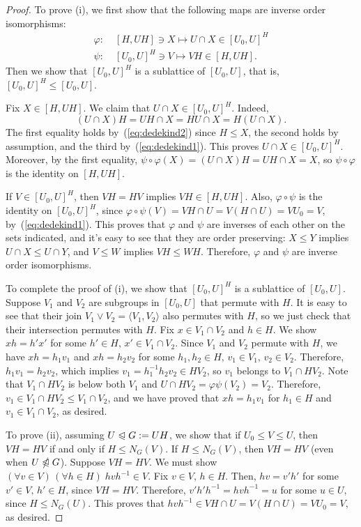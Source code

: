 \documentclass[11pt]{amsart}
\theoremstyle{plain}
\theoremstyle{definition}
\newcounter{claim}
\theoremstyle{remark}
\numberwithin{theorem}{section}
\numberwithin{claim}{section}
\numberwithin{equation}{section}
\numberwithin{conjecture}{section}
\newcommand{\<}{\ensuremath{\langle}}
\renewcommand{\>}{\ensuremath{\rangle}}
\renewcommand{\leq}{\ensuremath{\leqslant}}
\newcommand{\subnormal}{\ensuremath{\trianglelefteqslant}}
\newcommand{\notsubnormal}{\ensuremath{\ntrianglelefteqslant}}
\newcommand{\join}{\ensuremath{\vee}}
\newcommand{\0}{\ensuremath{\mathbf{0}}}
\newcommand{\1}{\ensuremath{\mathbf{1}}}
\newcommand{\2}{\ensuremath{\mathbf{2}}}
\newcommand{\3}{\ensuremath{\mathbf{3}}}
\newcommand{\4}{\ensuremath{\mathbf{4}}}
\newcommand{\5}{\ensuremath{\mathbf{5}}}
\renewcommand{\phi}{\ensuremath{\varphi}}
\begin{document}
\begin{proof}
To prove (i), we first show that the following maps are inverse order isomorphisms:
\begin{align}
\label{eq:inverse-isos}
\phi: \;& [H, UH] \ni X \mapsto U\cap X \in [U_0, U]^H\\
\psi: \;& [U_0, U]^H \ni V \mapsto VH \in [H, UH].\nonumber
\end{align}
Then we show that $[U_0, U]^H$ is a sublattice of $[U_0,U]$, that is, 
$[U_0, U]^H\leq [U_0,U]$.

Fix $X\in [H, UH]$. We claim that $U\cap X \in [U_0, U]^H$. Indeed,
\[
    (U\cap X) H = UH \cap X=
               HU \cap X
                = H(U \cap X).
\]
The first equality holds by~(\ref{eq:dedekind2}) since $H\leq X$, the second holds
by assumption, and the third by~(\ref{eq:dedekind1}).
  This proves $U\cap X \in [U_0, U]^H$.  Moreover, by the first equality,
$\psi \circ \phi (X) = (U\cap X)H =UH \cap X = X$,
so $\psi \circ \phi$ is the identity on $[H, UH]$.

If $V\in [U_0, U]^H$, then $VH = HV$ implies $VH \in [H, UH]$. Also, $\phi \circ
\psi$ is the identity on $[U_0, U]^H$, since $\phi \circ \psi(V)= VH \cap U =
V(H\cap U)= VU_0 = V$, by~(\ref{eq:dedekind1}). 
This proves that $\phi$ and $\psi$ are inverses of each other on the sets indicated, and
it's easy to see that they are order preserving:
$X\leq Y$ implies $U\cap X \leq U\cap Y$, and $V\leq W$ implies $VH \leq WH$.
Therefore, $\phi$ and $\psi$ are inverse order isomorphisms.

To complete the proof of (i), we show that
$[U_0, U]^H$ is a sublattice of $[U_0, U]$.  Suppose $V_1$ and $V_2$ are
subgroups in $[U_0, U]$ that permute with $H$.  
It is easy to see that their join $V_1 \join V_2 = \<V_1, V_2\>$ also permutes
with $H$, so we just check that their intersection permutes with $H$.  Fix
$x \in V_1 \cap V_2$ and $h\in H$.  We show $xh = h'x'$ for some $h'\in H, \, x'
\in V_1\cap V_2$. Since $V_1$ and $V_2$ permute with $H$, we have $xh = h_1 v_1$
and $xh = h_2 v_2$ for some $h_1, h_2\in H, \, v_1 \in V_1, \, v_2 \in V_2$.
Therefore, $h_1 v_1 = h_2 v_2$, which implies $v_1 = h_1^{-1}h_2 v_2 \in HV_2$,
so $v_1$ belongs to $V_1 \cap HV_2$. Note that $V_1 \cap HV_2$ is below both $V_1$ and
$U\cap HV_2 = \phi \psi(V_2) = V_2$.  Therefore, $v_1 \in V_1 \cap HV_2 \leq V_1
\cap V_2$, and we have proved that $xh = h_1 v_1$ for $h_1\in H$ and $v_1 \in
V_1\cap V_2$, as desired. 

To prove (ii), assuming $U\subnormal G:=UH$, we show that if $U_0 \leq V \leq U$,
then $VH = HV$ if and only if $H\leq N_G(V)$.
If $H\leq N_G(V)$, then $VH = HV$ (even when $U \notsubnormal G$).
Suppose $VH = HV$.  We must show $(\forall v\in V)\, (\forall h\in H)\; hvh^{-1}\in
V$.  Fix $v\in V, \, h\in H$.  Then, $hv = v'h'$ for some $v'\in V,\, h'\in H$, since
$VH = HV$.  Therefore, $v' h' h^{-1} = hvh^{-1} = u$ for some $u\in U$, since
$H\leq N_G(U)$. This proves that $hvh^{-1}\in VH\cap U = V(H\cap U) = VU_0 = V$, as
desired.
\end{proof}
\end{document}
